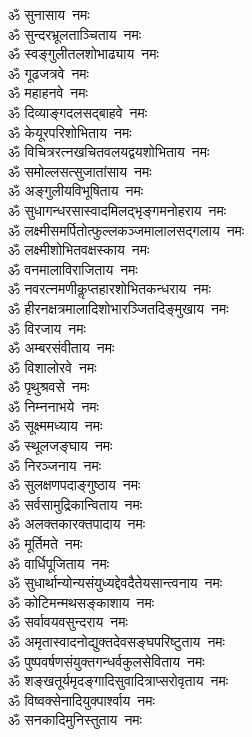 \begin{multicols}{2}
\begin{flushleft}
ॐ सुनासाय~नमः\\
ॐ सुन्दरभ्रूलताञ्चिताय~नमः\\
ॐ स्वङ्गुलीतलशोभाढ्याय~नमः\\
ॐ गूढजत्रवे~नमः\hfill{}\\
ॐ महाहनवे~नमः\\
ॐ दिव्याङ्गदलसद्बाहवे~नमः\\
ॐ केयूरपरिशोभिताय~नमः\\
ॐ विचित्ररत्नखचितवलयद्वय\-शोभिताय~नमः\\
ॐ समोल्लसत्सुजातांसाय~नमः\\
ॐ अङ्गुलीयविभूषिताय~नमः\\
ॐ सुधागन्धरसास्वादमिलद्भृङ्ग\-मनोहराय~नमः\\
ॐ लक्ष्मीसमर्पितोत्फुल्ल\-कञ्जमालालसद्गलाय~नमः\\
ॐ लक्ष्मीशोभितवक्षस्काय~नमः\\
ॐ वनमालाविराजिताय~नमः\hfill{}\\
ॐ नवरत्नमणीकॢप्तहारशोभित\-कन्धराय~नमः\\
ॐ हीरनक्षत्रमालादिशोभारञ्जित\-दिङ्मुखाय~नमः\\
ॐ विरजाय~नमः\\
ॐ अम्बरसंवीताय~नमः\\
ॐ विशालोरवे~नमः\\
ॐ पृथुश्रवसे~नमः\\
ॐ निम्ननाभये~नमः\\
ॐ सूक्ष्ममध्याय~नमः\\
ॐ स्थूलजङ्घाय~नमः\\
ॐ निरञ्जनाय~नमः\hfill{}\\
ॐ सुलक्षणपदाङ्गुष्ठाय~नमः\\
ॐ सर्वसामुद्रिकान्विताय~नमः\\
ॐ अलक्तकारक्तपादाय~नमः\\
ॐ मूर्तिमते~नमः\\
ॐ वार्धिपूजिताय~नमः\\
ॐ सुधार्थान्योन्यसंयुध्यद्देवदैतेय\-सान्त्वनाय~नमः\\
ॐ कोटिमन्मथसङ्काशाय~नमः\\
ॐ सर्वावयवसुन्दराय~नमः\\
ॐ अमृतास्वादनोद्युक्तदेवसङ्घ\-परिष्टुताय~नमः\\
ॐ पुष्पवर्षणसंयुक्तगन्धर्वकुल\-सेविताय~नमः\hfill{}\\
ॐ शङ्खतूर्यमृदङ्गादि\-सुवादित्राप्सरोवृताय~नमः\\
ॐ विष्वक्सेनादियुक्पार्श्वाय~नमः\\
ॐ सनकादिमुनिस्तुताय~नमः\\

\end{flushleft}
\end{multicols}
